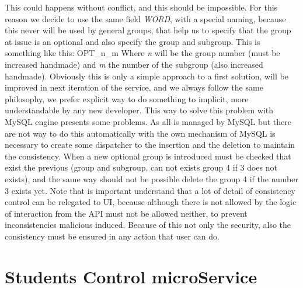 \noindent This could happens without conflict, and this should be impossible.
For this reason we decide to use the same field \textit{WORD}, with a special
naming, because this never will be used by general groups, that help us to
specify that the group at issue is an optional and also specify the group
and subgroup.
\intro
This is something like this: OPT\_n\_m
Where \textit{n} will be the group number (must be increased handmade) and \textit{m}
the number of the subgroup (also increased handmade).
Obviously this is only a simple approach to a first solution, will be improved
in next iteration of the service, and we always follow the same philosophy,
we prefer explicit way to do something to implicit, more understandable by
any new developer.
\intro
This way to solve this problem with MySQL engine presents some problems.
As all is managed by MySQL but there are not way to do this automatically
with the own mechanism of MySQL is necessary to create some dispatcher to the
insertion and the deletion to maintain the consistency. When a new optional group
is introduced must be checked that exist the previous (group and subgroup, can not
exists group 4 if 3 does not exists), and the same way should not be possible
delete the group 4 if the number 3 exists yet.
\intro
Note that is important understand that a lot of detail of consistency control
can be relegated to UI, because although there is not allowed by the logic
of interaction from the API must not be allowed neither, to prevent
inconsistencies malicious induced.
\intro
Because of this not only the security, also the consistency must be ensured in
any action that user can do.


\section{Students Control microService}

